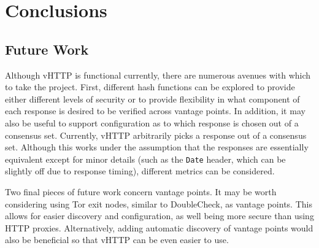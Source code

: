 \section{Conclusions}
\label{sec:conclusion}


\subsection{Future Work}

Although vHTTP is functional currently, there are numerous avenues with which
to take the project. First, different hash functions can be explored to provide
either different levels of security or to provide flexibility in what component
of each response is desired to be verified across vantage points. In addition,
it may also be useful to support configuration as to which response is chosen
out of a consensus set. Currently, vHTTP arbitrarily picks a response out of a
consensus set. Although this works under the assumption that the responses are
essentially equivalent except for minor details (such as the \texttt{Date}
header, which can be slightly off due to response timing), different metrics
can be considered.

Two final pieces of future work concern vantage points. It may be worth
considering using Tor exit nodes, similar to DoubleCheck, as vantage points.
This allows for easier discovery and configuration, as well being more secure
than using HTTP proxies. Alternatively, adding automatic discovery of vantage
points would also be beneficial so that vHTTP can be even easier to use.
